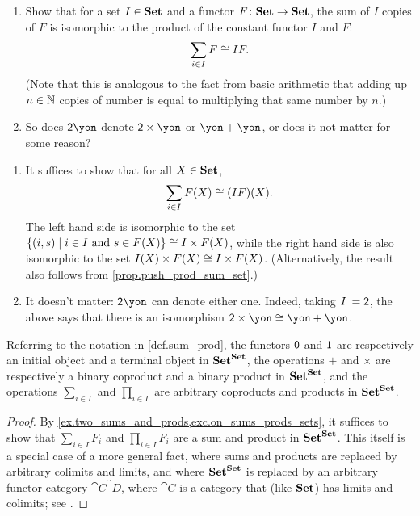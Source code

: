 \documentclass[Book-Poly]{subfiles}
\begin{document}
\begin{exercise} \label{exc.repeated_sum_is_product}
\begin{enumerate}
	\item Show that for a set $I \in \mathbf{Set}$ and a functor $F \colon \mathbf{Set} \to \mathbf{Set}$, the sum of $I$ copies of $F$ is isomorphic to the product of the constant functor $I$ and $F$:
    \[
        \sum_{i \in I} F \cong IF.
    \]
    (Note that this is analogous to the fact from basic arithmetic that adding up $n \in \mathbb{N}$ copies of number is equal to multiplying that same number by $n$.)
	\item So does $\2\yon$ denote $\2\times\yon$ or $\yon+\yon$, or does it not matter for some reason?
\qedhere
	\end{enumerate}
\begin{solution}
\begin{enumerate}
	\item It suffices to show that for all $X \in \mathbf{Set}$,
    \[
      \sum_{i \in I} F(X) \cong (IF)(X).
    \]
    The left hand side is isomorphic to the set $\{(i,s)\mid i\in I\text{ and }s\in F(X)\} \cong I \times F(X)$, while the right hand side is also isomorphic to the set $I(X) \times F(X) \cong I \times F(X)$. (Alternatively, the result also follows from \cref{prop.push_prod_sum_set}.)
    \item It doesn't matter: $\2\yon$ can denote either one. Indeed, taking $I\coloneqq\textsf{2}$, the above says that there is an isomorphism $\2\times\yon\cong\yon+\yon$. 
\end{enumerate}
\end{solution}
\end{exercise}

\begin{proposition} \label{prop.prods_coprods_set_endofuncs}
Referring to the notation in \cref{def.sum_prod}, the functors $\textsf{0}$ and $\textsf{1}$ are respectively an initial object and a terminal object in $\mathbf{Set}^{\mathbf{Set}}$, the operations $+$ and $\times$ are respectively a binary coproduct and a binary product in $\mathbf{Set}^{\mathbf{Set}}$, and the operations $\sum_{i\in I}$ and $\prod_{i\in I}$ are arbitrary coproducts and products in $\mathbf{Set}^{\mathbf{Set}}$.
\end{proposition}
\begin{proof}
By \cref{ex.two_sums_and_prods,exc.on_sums_prods_sets}, it suffices to show that $\sum_{i\in I}F_i$ and $\prod_{i\in I}F_i$ are a sum and product in $\mathbf{Set}^{\mathbf{Set}}$. This itself is a special case of a more general fact, where sums and products are replaced by arbitrary colimits and limits, and where $\mathbf{Set}^{\mathbf{Set}}$ is replaced by an arbitrary functor category $\cat{C}^\cat{D}$, where $\cat{C}$ is a category that (like $\mathbf{Set}$) has limits and colimits; see \cite[page 22 -- 23, displays (24) and (25)]{macLane1992sheaves}.
\end{proof}
\end{document}
